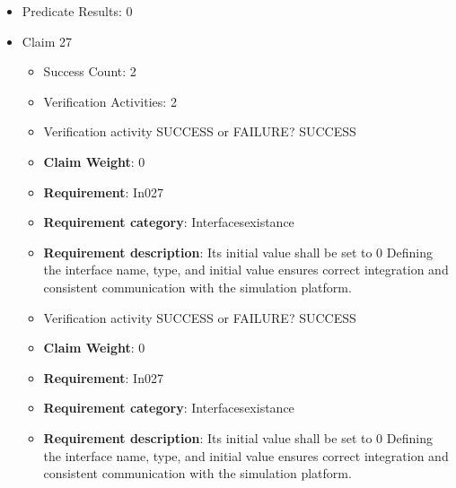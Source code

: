 \documentclass{article}
\begin{document}
\begin{itemize}
\begin{itemize}
					\item Verification activity SUCCESS or FAILURE? SUCCESS
					\item \textbf{Claim Weight}: 0
						\item \textbf{Requirement}: In026 
						\item \textbf{Requirement category}: Interfacesexistance 
						\item \textbf{Requirement description}: Its initial value shall be set to 1 Defining the interface name, type, and initial value ensures correct integration and consistent communication with the simulation platform.
					
				\end{itemize}
				
									    
				\item Predicate Results: 0

  				  \item Claim 27
				\begin{itemize}
			    	\item Success Count: 2 
			    	\item Verification Activities: 2
					\item Verification activity SUCCESS or FAILURE? SUCCESS
					\item \textbf{Claim Weight}: 0
						\item \textbf{Requirement}: In027 
						\item \textbf{Requirement category}: Interfacesexistance 
						\item \textbf{Requirement description}: Its initial value shall be set to 0 Defining the interface name, type, and initial value ensures correct integration and consistent communication with the simulation platform.
					
					\item Verification activity SUCCESS or FAILURE? SUCCESS
					\item \textbf{Claim Weight}: 0
						\item \textbf{Requirement}: In027 
						\item \textbf{Requirement category}: Interfacesexistance 
						\item \textbf{Requirement description}: Its initial value shall be set to 0 Defining the interface name, type, and initial value ensures correct integration and consistent communication with the simulation platform.
					
				\end{itemize}
				

\end{itemize}
\end{document}

